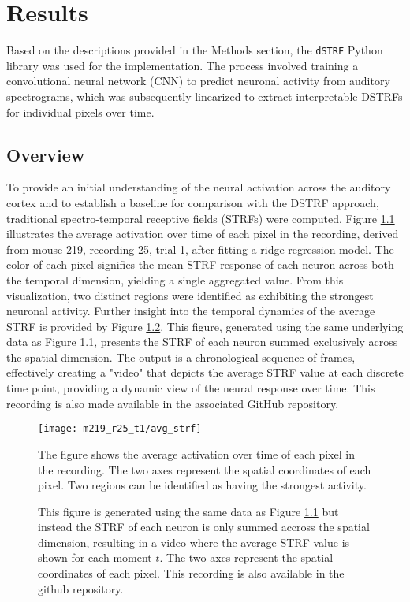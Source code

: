 \chapter{Results}\label{results}
 
Based on the descriptions provided in the Methods section, the \verb|dSTRF| Python library was used for the implementation. The process involved training a convolutional neural network (CNN) to predict neuronal activity from auditory spectrograms, which was subsequently linearized to extract interpretable DSTRFs for individual pixels over time. 

\section{Overview} 
To provide an initial understanding of the neural activation across the auditory cortex and to establish a baseline for comparison with the DSTRF approach, traditional spectro-temporal receptive fields (STRFs) were computed. Figure \ref{fig:strf_m219_r25} illustrates the average activation over time of each pixel in the recording, derived from mouse 219, recording 25, trial 1, after fitting a ridge regression model. The color of each pixel signifies the mean STRF response of each neuron across both the temporal dimension, yielding a single aggregated value. From this visualization, two distinct regions were identified as exhibiting the strongest neuronal activity. Further insight into the temporal dynamics of the average STRF is provided by Figure \ref{fig:strf_temp_avg}. This figure, generated using the same underlying data as Figure \ref{fig:strf_m219_r25}, presents the STRF of each neuron summed exclusively across the spatial dimension. The output is a chronological sequence of frames, effectively creating a "video" that depicts the average STRF value at each discrete time point, providing a dynamic view of the neural response over time. This recording is also made available in the associated GitHub repository.

\begin{figure}[!htb]
	\centering
	\texttt{[image: m219\_r25\_t1/avg\_strf]}
	\caption{The figure shows the average activation over time of each pixel in the recording. The two axes represent the spatial coordinates of each pixel. Two regions can be identified as having the strongest activity.}
	\label{fig:strf_m219_r25}
\end{figure}

\begin{figure}[!htb]
	\centering
	\caption{This figure is generated using the same data as Figure \ref{fig:strf_m219_r25} but instead the STRF of each neuron is only summed accross the spatial dimension, resulting in a video where the average STRF value is shown for each moment $t$. The two axes represent the spatial coordinates of each pixel. This recording is also available in the github repository.}
	\label{fig:strf_temp_avg}
\end{figure}


